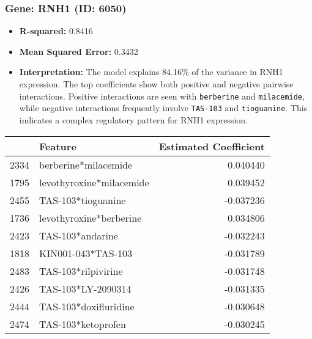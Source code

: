 \documentclass[12pt]{article}
\begin{document}
\subsubsection{Gene: RNH1 (ID: 6050)}
\begin{itemize}
    \item \textbf{R-squared:} 0.8416
    \item \textbf{Mean Squared Error:} 0.3432
    \item \textbf{Interpretation:} The model explains 84.16\% of the variance in RNH1 expression. The top coefficients show both positive and negative pairwise interactions. Positive interactions are seen with \texttt{berberine} and \texttt{milacemide}, while negative interactions frequently involve \texttt{TAS-103} and \texttt{tioguanine}. This indicates a complex regulatory pattern for RNH1 expression.
\end{itemize}
\begin{tabularx}{\textwidth}{l X r}
\toprule
{} & Feature & Estimated Coefficient \\
\midrule
2334 & berberine*milacemide & 0.040440 \\
1795 & levothyroxine*milacemide & 0.039452 \\
2455 & TAS-103*tioguanine & -0.037236 \\
1736 & levothyroxine*berberine & 0.034806 \\
2423 & TAS-103*andarine & -0.032243 \\
1818 & KIN001-043*TAS-103 & -0.031789 \\
2483 & TAS-103*rilpivirine & -0.031748 \\
2426 & TAS-103*LY-2090314 & -0.031335 \\
2444 & TAS-103*doxifluridine & -0.030648 \\
2474 & TAS-103*ketoprofen & -0.030245 \\
\bottomrule
\end{tabularx}
\end{document}
